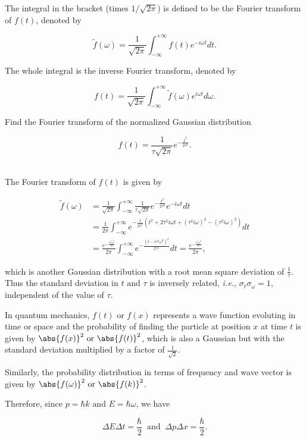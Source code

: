 \documentclass[english,a4paper,12pt]{report}
\begin{document}
The integral in the bracket (times \(1 /\sqrt{2\pi }  \)) is defined to be the Fourier transform of \(f(t)\), denoted by 

\begin{equation}
    \tilde{f}(\omega ) = \frac{1}{\sqrt{2\pi } } \int_{-\infty}^{+\infty} f(t) e^{-i \omega t}dt.     
\end{equation}

The whole integral is the inverse Fourier transform, denoted by 

\begin{equation}
    f(t) = \frac{1}{\sqrt{2\pi } } \int_{-\infty}^{+\infty} \tilde{f}(\omega )e^{i \omega t} d \omega .     
\end{equation}

{Find the Fourier transform of the normalized Gaussian distribution 

\begin{equation}
    f(t) = \frac{1}{\tau \sqrt{2\pi } } e^{-\frac{t^2}{2\tau ^2} }.
\end{equation}~
}
{The Fourier transform of \(f(t)\) is given by 

\begin{equation}
    \begin{aligned} 
    \tilde{f}(\omega ) &= \frac{1}{\sqrt{2\pi } } \int_{-\infty}^{+\infty} \frac{1}{\tau \sqrt{2\pi } } e^{-\frac{t^2}{2\tau ^2} } e^{-i \omega t}dt \\
    &= \frac{1}{2\pi  } \int_{-\infty}^{+\infty}  e^{-\frac{1}{2\tau ^2} (t^2 + 2\tau ^2i \omega t + (\tau ^2i \omega )^2 - (\tau ^2 i \omega )^2) } dt \\
    &= \frac{e^{-\frac{\tau ^2\omega ^2}{2} } }{2\pi  }  \int_{-\infty}^{+\infty} e^{-\frac{(t-i\tau ^2\omega ^2)^2}{2\tau ^2} }dt = \frac{e^{-\frac{\tau ^2\omega ^2}{2} } }{2\pi  },
    \end{aligned}         
\end{equation}

which is another Gaussian distribution with a root mean square deviation of \(\frac{1}{\tau } \). Thus the standard deviation in \(t \text { and } \tau \) is inversely related, \textit{i.e.,} \(\sigma _{t}\sigma _{\omega }=1  \), independent of the value of \(\tau \). 

In quantum mechanics, \(f(t) \text { or }  f(x)\) represents a wave function evoluting in time or space and the probability of finding the particle at position \(x\) at time \(t\) is given by \(\abs{f(x)}^2 \text { or } \abs{f(t)}^2  \), which is also a Gaussian but with the standard deviation multiplied by a factor of \(\frac{1}{\sqrt{2} } \). 

Similarly, the probability distribution in terms of frequency and wave vector is given by \(\abs{f(\omega )}^2 \text { or } \abs{f(k)}^2 \). 

Therefore, since \(p = \hbar k \text { and } E = \hbar \omega \), we have 

\begin{equation}
    \Delta E \Delta t = \frac{\hbar }{2} ~\text { and }~ \Delta p\Delta x = \frac{\hbar }{2}.  
\end{equation}


} 
\end{document}
